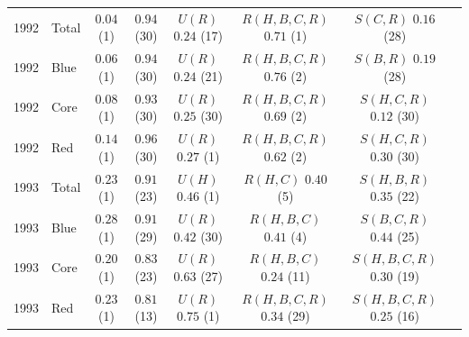 \documentclass[fleqn,usenatbib]{mnras}
\newenvironment{SURDtable}{\begin{table}}{\end{table}}
\begin{document}
\begin{SURDtable}
\begin{tabular}{rlcccccc}
\midrule
1992 & Total & $0.04$ (1) & $0.94$ (30) & $U(R)$ $0.24$ (17) & $R(H,B,C,R)$ $0.71$ (1) & $S(C,R)$ $0.16$ (28) \\
1992 & Blue & $0.06$ (1) & $0.94$ (30) & $U(R)$ $0.24$ (21) & $R(H,B,C,R)$ $0.76$ (2) & $S(B,R)$ $0.19$ (28) \\
1992 & Core & $0.08$ (1) & $0.93$ (30) & $U(R)$ $0.25$ (30) & $R(H,B,C,R)$ $0.69$ (2) & $S(H,C,R)$ $0.12$ (30) \\
1992 & Red & $0.14$ (1) & $0.96$ (30) & $U(R)$ $0.27$ (1) & $R(H,B,C,R)$ $0.62$ (2) & $S(H,C,R)$ $0.30$ (30) \\
\midrule
1993 & Total & $0.23$ (1) & $0.91$ (23) & $U(H)$ $0.46$ (1) & $R(H,C)$ $0.40$ (5) & $S(H,B,R)$ $0.35$ (22) \\
1993 & Blue & $0.28$ (1) & $0.91$ (29) & $U(R)$ $0.42$ (30) & $R(H,B,C)$ $0.41$ (4) & $S(B,C,R)$ $0.44$ (25) \\
1993 & Core & $0.20$ (1) & $0.83$ (23) & $U(R)$ $0.63$ (27) & $R(H,B,C)$ $0.24$ (11) & $S(H,B,C,R)$ $0.30$ (19) \\
1993 & Red & $0.23$ (1) & $0.81$ (13) & $U(R)$ $0.75$ (1) & $R(H,B,C,R)$ $0.34$ (29) & $S(H,B,C,R)$ $0.25$ (16) \\
\bottomrule
\end{tabular}

\end{SURDtable}
\end{document}
